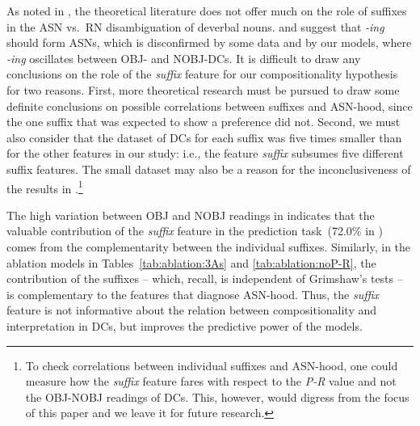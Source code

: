 \documentclass[output=paper]{langsci/langscibook}
\begin{document}
 {As noted in , the theoretical literature does not offer much on the role of suffixes in the ASN vs.\ RN disambiguation of deverbal nouns. \cite{grimshaw:90} and \cite{borer:13} suggest that \textit{-ing} should form ASNs, which is disconfirmed by some data and by our models, where \textit{-ing} oscillates between OBJ- and NOBJ-DCs. It is difficult to draw any conclusions on the role of the \textit{suffix} feature for our compositionality hypothesis for two reasons. First, more theoretical research must be pursued to draw some definite conclusions on possible correlations between suffixes and ASN-hood, since the one suffix that was expected to show a preference did not. Second, we must also consider that the dataset of DCs for each suffix was five times smaller than for the other features in our study: i.e., the feature \textit{suffix} subsumes five different suffix features. The small dataset may also be a reason for the inconclusiveness of the results in .}\footnote{ {To check correlations between individual suffixes and ASN-hood, one could measure how the \textit{suffix} feature fares with respect to the \textit{P-R} value and not the OBJ-NOBJ readings of DCs. This, however, would digress from the focus of this paper and we leave it for future research.}}


The high variation between OBJ and NOBJ readings  in   indicates that the valuable contribution of the \textit{suffix} feature in the prediction task~(72.0\% in ) comes from the complementarity between the individual suffixes. Similarly, in the ablation models in Tables~\ref{tab:ablation:3As} and \ref{tab:ablation:noP-R}, the contribution of the suffixes -- which, recall, is independent of Grimshaw's tests -- is complementary to the features that diagnose ASN-hood. Thus, the \textit{suffix} feature is not informative about the relation between compositionality and interpretation in DCs, but improves the predictive power of the models.
\end{document}
